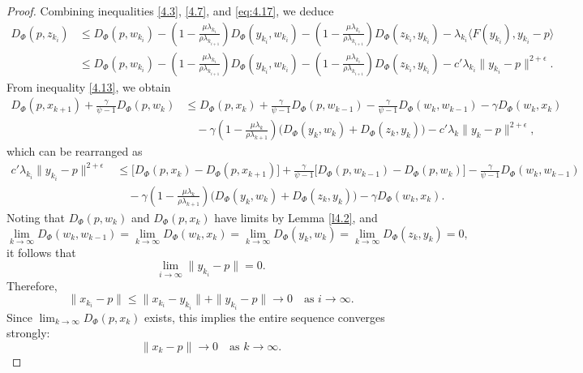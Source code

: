\documentclass[hidelinks,11 pt]{article}
\numberwithin{equation}{section}
\theoremstyle{definition}  %
\numberwithin{equation}{section}
\numberwithin{theorem}{section}
\begin{document}
\begin{proof}
Combining inequalities \eqref{4.3}, \eqref{4.7}, and \eqref{eq:4.17}, we deduce
\[
\begin{aligned}
D_{\Phi}(p, z_{k_i}) &\leq D_{\Phi}(p, w_{k_i}) - \left(1 - \frac{\mu \lambda_{k_i}}{\rho \lambda_{k_{i+1}}}\right) D_{\Phi}(y_{k_i}, w_{k_i}) - \left(1 - \frac{\mu \lambda_{k_i}}{\rho \lambda_{k_{i+1}}}\right) D_{\Phi}(z_{k_i}, y_{k_i}) - \lambda_{k_i} \langle F(y_{k_i}), y_{k_i} - p \rangle \\
&\leq D_{\Phi}(p, w_{k_i}) - \left(1 - \frac{\mu \lambda_{k_i}}{\rho \lambda_{k_{i+1}}}\right) D_{\Phi}(y_{k_i}, w_{k_i}) - \left(1 - \frac{\mu \lambda_{k_i}}{\rho \lambda_{k_{i+1}}}\right) D_{\Phi}(z_{k_i}, y_{k_i}) - c' \lambda_{k_i} \|y_{k_i} - p\|^{2 + \epsilon}.
\end{aligned}
\]
From inequality \eqref{4.13}, we obtain
\[
\begin{aligned}
D_{\Phi}(p, x_{k+1}) + \frac{\gamma}{\psi - 1} D_{\Phi}(p, w_k) &\leq D_{\Phi}(p, x_k) + \frac{\gamma}{\psi - 1} D_{\Phi}(p, w_{k-1}) - \frac{\gamma}{\psi - 1} D_{\Phi}(w_k, w_{k-1}) - \gamma D_{\Phi}(w_k, x_k) \\
&\quad - \gamma \left(1 - \frac{\mu \lambda_k}{\rho \lambda_{k+1}}\right) \bigl(D_{\Phi}(y_k, w_k) + D_{\Phi}(z_k, y_k)\bigr) - c' \lambda_k \|y_k - p\|^{2 + \epsilon},
\end{aligned}
\]
which can be rearranged as
\[
\begin{aligned}
c' \lambda_{k_i} \|y_{k_i} - p\|^{2 + \epsilon} &\leq \bigl[D_{\Phi}(p, x_k) - D_{\Phi}(p, x_{k+1})\bigr] + \frac{\gamma}{\psi - 1} \bigl[D_{\Phi}(p, w_{k-1}) - D_{\Phi}(p, w_k)\bigr] - \frac{\gamma}{\psi - 1} D_{\Phi}(w_k, w_{k-1}) \\
&\quad - \gamma \left(1 - \frac{\mu \lambda_k}{\rho \lambda_{k+1}}\right) \bigl(D_{\Phi}(y_k, w_k) + D_{\Phi}(z_k, y_k)\bigr) - \gamma D_{\Phi}(w_k, x_k).
\end{aligned}
\]
Noting that \(D_{\Phi}(p, w_k)\) and \(D_{\Phi}(p, x_k)\) have limits by Lemma \ref{l4.2}, and
\[
\lim_{k \to \infty} D_{\Phi}(w_k, w_{k-1}) = \lim_{k \to \infty} D_{\Phi}(w_k, x_k) = \lim_{k \to \infty} D_{\Phi}(y_k, w_k) = \lim_{k \to \infty} D_{\Phi}(z_k, y_k) = 0,
\]
it follows that
\[
\lim_{i \to \infty} \|y_{k_i} - p\| = 0.
\]
Therefore,
\[
\|x_{k_i} - p\| \leq \|x_{k_i} - y_{k_i}\| + \|y_{k_i} - p\| \to 0 \quad \text{as } i \to \infty.
\]
Since \(\lim_{k \to \infty} D_{\Phi}(p, x_k)\) exists, this implies the entire sequence converges strongly:
\[
\|x_k - p\| \to 0 \quad \text{as } k \to \infty.
\]


\end{proof}
\end{document}
